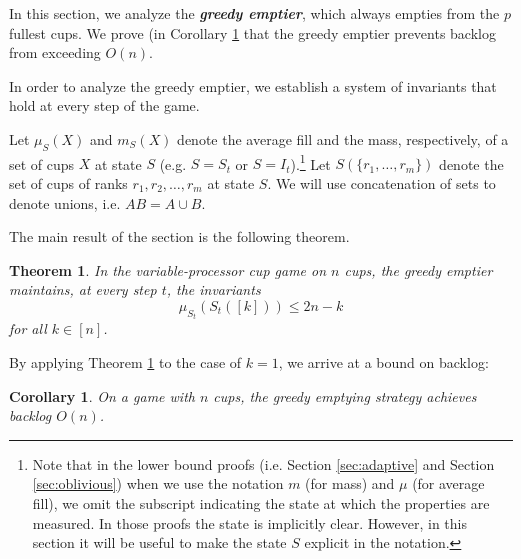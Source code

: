 \documentclass[twocolumn]{article}[10pt]
\newcommand{\defn}[1]{{\textit{\textbf{\boldmath #1}}}\xspace}
\newtheorem{corollary}{Corollary}
\newtheorem{theorem}{Theorem}
\begin{document}
In this section, we analyze the \defn{greedy emptier}, which always empties from the $p$ fullest cups. We prove (in Corollary \ref{cor:upperbound} that the greedy emptier prevents backlog from exceeding $O(n)$. 

In order to analyze the greedy emptier, we establish a system of invariants that hold at every step of the game. 

Let $\mu_S(X)$ and $m_S(X)$ denote the average fill and the mass, respectively, of a set of cups $X$
at state $S$ (e.g. $S=S_t$ or $S=I_t$).\footnote{Note that in the lower bound
  proofs (i.e. Section \ref{sec:adaptive} and Section \ref{sec:oblivious}) when we use the notation $m$ (for
  mass) and $\mu$ (for average fill), we omit the subscript indicating the
  state at which the properties are measured. In those proofs the state is implicitly clear. However, in this section it will be useful to make the state $S$ explicit in the notation.}
Let $S(\{r_1, \ldots, r_m\})$ denote the set of cups of ranks $r_1, r_2, \ldots, r_m$ at state $S$.
We will use concatenation of sets to denote unions, i.e. $AB = A\cup B$. 

The main result of the section is the following theorem.  
\begin{theorem}
  \label{thm:invariant}
  In the variable-processor cup game on $n$ cups, the greedy emptier maintains, at every step $t$,
  the invariants
  \begin{equation}
    \label{eq:invariants}
      \mu_{S_t}(S_t([k])) \le 2n-k
  \end{equation}
  for all  $k \in [n]$.
\end{theorem}

By applying Theorem \ref{thm:invariant} to the case of $k = 1$, we arrive at a bound on backlog:
\begin{corollary}
  On a game with $n$ cups, the greedy emptying strategy achieves backlog $O(n)$.
  \label{cor:upperbound}
\end{corollary}
\end{document}
